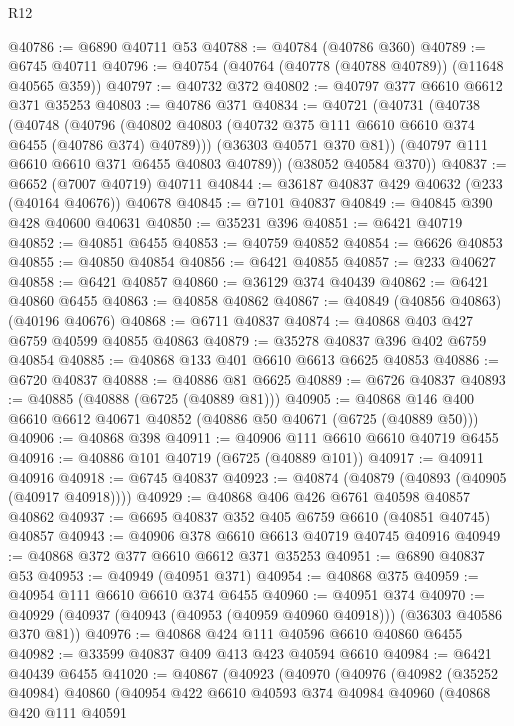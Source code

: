 \begin{lexlean}{R12}
\begin{coremodule}
@40786 := @6890 @40711 @53
@40788 := @40784 (@40786 @360)
@40789 := @6745 @40711
@40796 := @40754 (@40764 (@40778 (@40788 @40789)) (@11648 @40565 @359))
@40797 := @40732 @372
@40802 := @40797 @377 @6610 @6612 @371 @35253
@40803 := @40786 @371
@40834 := @40721
    (@40731
      (@40738
        (@40748
          (@40796 (@40802 @40803 (@40732 @375 @111 @6610 @6610 @374 @6455 (@40786 @374) @40789)))
          (@36303 @40571 @370 @81))
        (@40797 @111 @6610 @6610 @371 @6455 @40803 @40789))
      (@38052 @40584 @370))
@40837 := @6652 (@7007 @40719) @40711
@40844 := @36187 @40837 @429 @40632 (@233 (@40164 @40676)) @40678
@40845 := @7101 @40837
@40849 := @40845 @390 @428 @40600 @40631
@40850 := @35231 @396
@40851 := @6421 @40719
@40852 := @40851 @6455
@40853 := @40759 @40852
@40854 := @6626 @40853
@40855 := @40850 @40854
@40856 := @6421 @40855
@40857 := @233 @40627
@40858 := @6421 @40857
@40860 := @36129 @374 @40439
@40862 := @6421 @40860 @6455
@40863 := @40858 @40862
@40867 := @40849 (@40856 @40863) (@40196 @40676)
@40868 := @6711 @40837
@40874 := @40868 @403 @427 @6759 @40599 @40855 @40863
@40879 := @35278 @40837 @396 @402 @6759 @40854
@40885 := @40868 @133 @401 @6610 @6613 @6625 @40853
@40886 := @6720 @40837
@40888 := @40886 @81 @6625
@40889 := @6726 @40837
@40893 := @40885 (@40888 (@6725 (@40889 @81)))
@40905 := @40868 @146 @400 @6610 @6612 @40671 @40852 (@40886 @50 @40671 (@6725 (@40889 @50)))
@40906 := @40868 @398
@40911 := @40906 @111 @6610 @6610 @40719 @6455
@40916 := @40886 @101 @40719 (@6725 (@40889 @101))
@40917 := @40911 @40916
@40918 := @6745 @40837
@40923 := @40874 (@40879 (@40893 (@40905 (@40917 @40918))))
@40929 := @40868 @406 @426 @6761 @40598 @40857 @40862
@40937 := @6695 @40837 @352 @405 @6759 @6610 (@40851 @40745) @40857
@40943 := @40906 @378 @6610 @6613 @40719 @40745 @40916
@40949 := @40868 @372 @377 @6610 @6612 @371 @35253
@40951 := @6890 @40837 @53
@40953 := @40949 (@40951 @371)
@40954 := @40868 @375
@40959 := @40954 @111 @6610 @6610 @374 @6455
@40960 := @40951 @374
@40970 := @40929 (@40937 (@40943 (@40953 (@40959 @40960 @40918))) (@36303 @40586 @370 @81))
@40976 := @40868 @424 @111 @40596 @6610 @40860 @6455
@40982 := @33599 @40837 @409 @413 @423 @40594 @6610
@40984 := @6421 @40439 @6455
@41020 := @40867
    (@40923
      (@40970
        (@40976
          (@40982
            (@35252 @40984)
            @40860
            (@40954
              @422
              @6610
              @40593
              @374
              @40984
              @40960
              (@40868
                @420
                @111
                @40591

\end{coremodule}
\end{lexlean}
